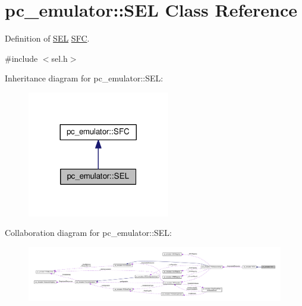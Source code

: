 \hypertarget{classpc__emulator_1_1SEL}{}\section{pc\+\_\+emulator\+:\+:S\+EL Class Reference}
\label{classpc__emulator_1_1SEL}


Definition of \hyperlink{classpc__emulator_1_1SEL}{S\+EL} \hyperlink{classpc__emulator_1_1SFC}{S\+FC}.  




{\ttfamily \#include $<$sel.\+h$>$}



Inheritance diagram for pc\+\_\+emulator\+:\+:S\+EL\+:
\nopagebreak
\begin{figure}[H]
\begin{center}
\leavevmode
\includegraphics[width=176pt]{classpc__emulator_1_1SEL__inherit__graph}
\end{center}
\end{figure}


Collaboration diagram for pc\+\_\+emulator\+:\+:S\+EL\+:
\nopagebreak
\begin{figure}[H]
\begin{center}
\leavevmode
\includegraphics[width=350pt]{classpc__emulator_1_1SEL__coll__graph}
\end{center}
\end{figure}
